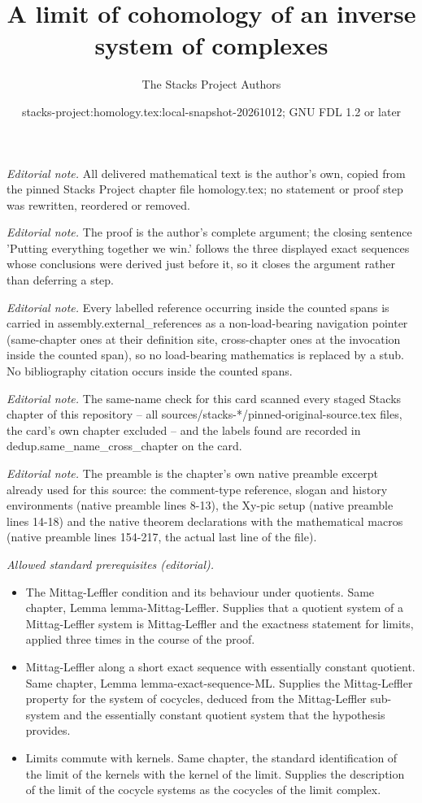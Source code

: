 \documentclass[10pt,a4paper]{amsart}
\title{A limit of cohomology of an inverse system of complexes}
\author{The Stacks Project Authors}
\date{stacks-project:homology.tex:local-snapshot-20261012; GNU FDL 1.2 or later}
\theoremstyle{plain}
\theoremstyle{definition}
\theoremstyle{remark}
\numberwithin{equation}{subsection}
\begin{document}
\maketitle
\noindent\textit{Editorial note.} All delivered mathematical text is the author's own, copied from the pinned Stacks Project chapter file homology.tex; no statement or proof step was rewritten, reordered or removed.\par\medskip
\noindent\textit{Editorial note.} The proof is the author's complete argument; the closing sentence 'Putting everything together we win.' follows the three displayed exact sequences whose conclusions were derived just before it, so it closes the argument rather than deferring a step.\par\medskip
\noindent\textit{Editorial note.} Every labelled reference occurring inside the counted spans is carried in assembly.external\_references as a non-load-bearing navigation pointer (same-chapter ones at their definition site, cross-chapter ones at the invocation inside the counted span), so no load-bearing mathematics is replaced by a stub. No bibliography citation occurs inside the counted spans.\par\medskip
\noindent\textit{Editorial note.} The same-name check for this card scanned every staged Stacks chapter of this repository -- all sources/stacks-*/pinned-original-source.tex files, the card's own chapter excluded -- and the labels found are recorded in dedup.same\_name\_cross\_chapter on the card.\par\medskip
\noindent\textit{Editorial note.} The preamble is the chapter's own native preamble excerpt already used for this source: the comment-type reference, slogan and history environments (native preamble lines 8-13), the Xy-pic setup (native preamble lines 14-18) and the native theorem declarations with the mathematical macros (native preamble lines 154-217, the actual last line of the file).\par\medskip
\noindent\textit{Allowed standard prerequisites (editorial).}\begin{itemize}
\item The Mittag-Leffler condition and its behaviour under quotients. Same chapter, Lemma lemma-Mittag-Leffler. Supplies that a quotient system of a Mittag-Leffler system is Mittag-Leffler and the exactness statement for limits, applied three times in the course of the proof.
\item Mittag-Leffler along a short exact sequence with essentially constant quotient. Same chapter, Lemma lemma-exact-sequence-ML. Supplies the Mittag-Leffler property for the system of cocycles, deduced from the Mittag-Leffler sub-system and the essentially constant quotient system that the hypothesis provides.
\item Limits commute with kernels. Same chapter, the standard identification of the limit of the kernels with the kernel of the limit. Supplies the description of the limit of the cocycle systems as the cocycles of the limit complex.
\end{itemize}\medskip
\end{document}
